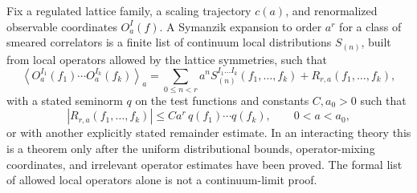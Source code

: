 \begin{definition}
\label{def:symanzik-expansion-data}
Fix a regulated lattice family, a scaling trajectory \(c(a)\), and
renormalized observable coordinates \(O_a^I(f)\).  A Symanzik expansion to
order \(a^r\) for a class of smeared correlators is a finite list of
continuum local distributions \(S_{(n)}\), built from local operators
allowed by the lattice symmetries, such that
\begin{equation}
  \left\langle
    O_a^{I_1}(f_1)\cdots O_a^{I_k}(f_k)
  \right\rangle_a
  =
  \sum_{0\le n<r} a^n
  S_{(n)}^{I_1\ldots I_k}(f_1,\ldots,f_k)
  +
  R_{r,a}(f_1,\ldots,f_k),
  \label{eq:symanzik-expansion-data}
\end{equation}
with a stated seminorm \(q\) on the test functions and constants
\(C,a_0>0\) such that
\[
  |R_{r,a}(f_1,\ldots,f_k)|
  \le C a^r\,q(f_1)\cdots q(f_k),
  \qquad 0<a<a_0,
\]
or with another explicitly stated remainder estimate.  In an interacting
theory this is a theorem only after the uniform distributional bounds,
operator-mixing coordinates, and irrelevant operator estimates have been
proved.  The formal list of allowed local operators alone is not a
continuum-limit proof.
\end{definition}

